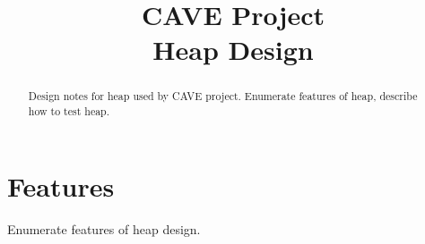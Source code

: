 
\title{CAVE Project \\
Heap Design}





\maketitle

\begin{abstract}

Design notes for heap used by CAVE project.  Enumerate features of heap,
describe how to test heap.

\end{abstract}

\section{Features}

Enumerate features of heap design.

